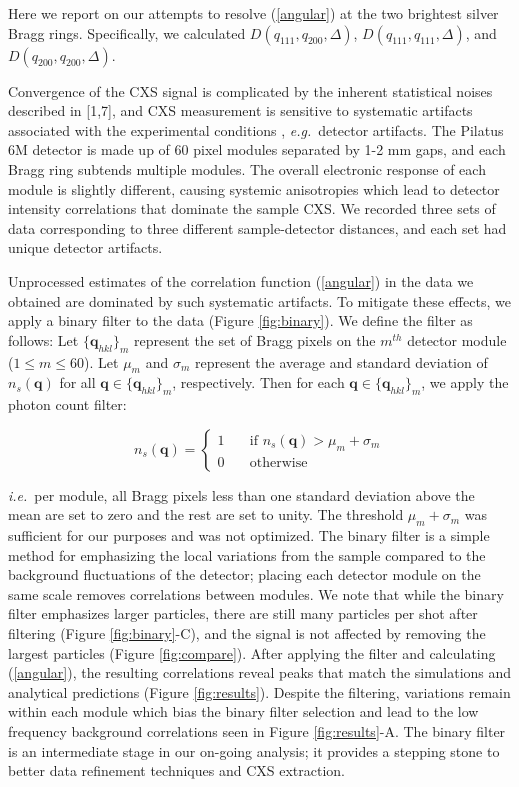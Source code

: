 \documentclass [11pt,fleqn]{article}
\begin{document}
Here we report on our attempts to resolve (\ref{angular}) at the two brightest silver Bragg rings. Specifically, we calculated $D (q_{111},q_{200}, \Delta  )$, $D (q_{111},q_{111}, \Delta  )$, and $D (q_{200},q_{200}, \Delta  )$. 

Convergence of the CXS signal is complicated by the inherent statistical noises described in [1,7], and CXS measurement is sensitive to systematic artifacts associated with the experimental conditions \cite{Kam:1981ua}, \textit{e.g.}~detector artifacts. The Pilatus 6M detector is made up of 60 pixel modules separated by 1-2 mm gaps, and each Bragg ring subtends multiple modules. The overall electronic response of each module is slightly different, causing systemic anisotropies which lead to detector intensity correlations that dominate the sample CXS. We recorded three sets of data corresponding to three different sample-detector distances, and each set had unique detector artifacts. 

Unprocessed estimates of the correlation function (\ref{angular}) in the data we obtained are dominated by such systematic artifacts. To mitigate these effects, we apply a binary filter to the data (Figure \ref{fig:binary}). We define the filter as follows: Let $\{ \bm q_{hkl} \}_{m}$ represent the set of Bragg pixels on the $m^{th}$ detector module ($1 \leq m \leq 60$). Let $\mu_m$ and $\sigma_m$ represent the average and standard deviation of $n_{s}(\bm q)$  for all $\bm q \in \{ \bm q_{hkl} \}_{m} $, respectively. Then for each $\bm q \in \{ \bm q_{hkl} \}_{m} $, we apply the photon count filter:

\[  n_{s}(\bm q ) = 
 \begin{cases} 
   1 & \quad \text{if } n_{s}(\bm q ) > \mu_m +  \sigma_m\\
   0 & \quad \text{otherwise} 
 \end{cases} 
 \]

\textit{i.e.}~per module, all Bragg pixels less than one standard deviation above the mean are set to zero and the rest are set to unity. The threshold $\mu_m + \sigma_m$ was sufficient for our purposes and was not optimized. The binary filter is a simple method for emphasizing the local variations from the sample compared to the background fluctuations of the detector; placing each detector module on the same scale removes correlations between modules. We note that while the binary filter emphasizes larger particles, there are still many particles per shot after filtering (Figure \ref{fig:binary}-C), and the signal is not affected by removing the largest particles (Figure \ref{fig:compare}). After applying the filter and calculating (\ref{angular}), the resulting correlations reveal peaks that match the simulations and analytical predictions (Figure \ref{fig:results}). Despite the filtering, variations remain within each module which bias the binary filter selection and lead to the low frequency background correlations seen in Figure \ref{fig:results}-A. The binary filter is an intermediate stage in our on-going analysis; it provides a stepping stone to better data refinement techniques and CXS extraction.
\end{document}
